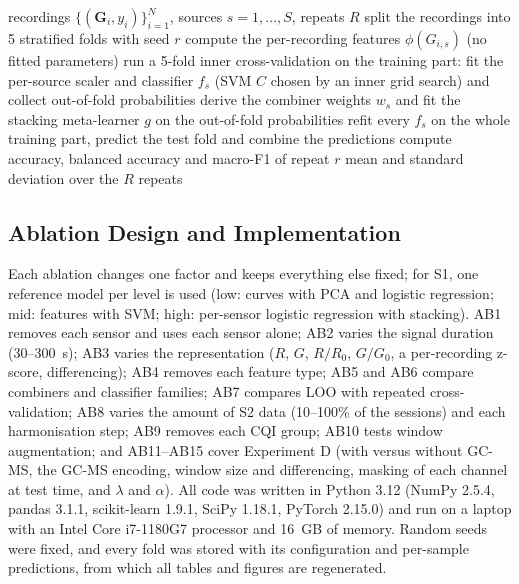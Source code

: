 \documentclass[12pt]{article}
\begin{document}
\begin{algorithm}[!htbp]
\caption[Leakage-free repeated cross-validation with high-level fusion]{Leakage-free repeated cross-validation with high-level fusion}
\label{alg:cv}
\begin{algorithmic}[1]
\REQUIRE recordings $\{(\mathbf{G}_i, y_i)\}_{i=1}^{N}$, sources $s = 1, \dots, S$, repeats $R$
\STATE split the recordings into 5 stratified folds with seed $r$
\STATE compute the per-recording features $\phi(G_{i,s})$ (no fitted parameters)
\STATE run a 5-fold inner cross-validation on the training part: fit the per-source scaler and classifier $f_s$ (SVM $C$ chosen by an inner grid search) and collect out-of-fold probabilities
\STATE derive the combiner weights $w_s$ and fit the stacking meta-learner $g$ on the out-of-fold probabilities
\STATE refit every $f_s$ on the whole training part, predict the test fold and combine the predictions
\ENDFOR
\STATE compute accuracy, balanced accuracy and macro-F1 of repeat $r$
\ENDFOR
\RETURN mean and standard deviation over the $R$ repeats
\end{algorithmic}
\end{algorithm}

\subsection{Ablation Design and Implementation}

Each ablation changes one factor and keeps everything else fixed; for S1, one reference model per level is used (low: curves with PCA and logistic regression; mid: features with SVM; high: per-sensor logistic regression with stacking). AB1 removes each sensor and uses each sensor alone; AB2 varies the signal duration (30--300~s); AB3 varies the representation ($R$, $G$, $R/R_0$, $G/G_0$, a per-recording z-score, differencing); AB4 removes each feature type; AB5 and AB6 compare combiners and classifier families; AB7 compares LOO with repeated cross-validation; AB8 varies the amount of S2 data (10--100\% of the sessions) and each harmonisation step; AB9 removes each CQI group; AB10 tests window augmentation; and AB11--AB15 cover Experiment D (with versus without GC-MS, the GC-MS encoding, window size and differencing, masking of each channel at test time, and $\lambda$ and $\alpha$). All code was written in Python 3.12 (NumPy 2.5.4, pandas 3.1.1, scikit-learn 1.9.1, SciPy 1.18.1, PyTorch 2.15.0) and run on a laptop with an Intel Core i7-1180G7 processor and 16~GB of memory. Random seeds were fixed, and every fold was stored with its configuration and per-sample predictions, from which all tables and figures are regenerated.
\clearpage
\end{document}

